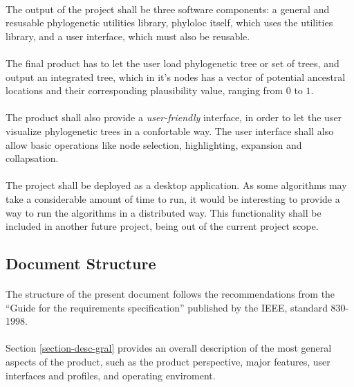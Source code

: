 \documentclass[10pt,a4paper]{article}
\begin{document}
\paragraph{}
The output of the project shall be three software components: a general and resusable phylogenetic utilities library, phyloloc itself, which uses the utilities library, and a user interface, which must also be reusable.
\paragraph{}
The final product has to let the user load phylogenetic tree or set of trees, and output an integrated tree, which in it's nodes has a vector of potential ancestral locations and their corresponding plausibility value, ranging from $0$ to $1$. 
\paragraph{}
The product shall also provide a \emph{user-friendly} interface, in order to let the user visualize phylogenetic trees in a confortable way. The user interface shall also allow basic operations like node selection, highlighting, expansion and collapsation.
\paragraph{}
The project shall be deployed as a desktop application. As some algorithms may take a considerable amount of time to run, it would be interesting to provide a way to run the algorithms in a distributed way. This functionality shall be included in another future project, being out of the current project scope.
\paragraph{}

  \subsection{Document Structure}
\paragraph{}
The structure of the present document follows the recommendations from the ``Guide for the requirements specification'' published by the IEEE, standard 830-1998. 
\paragraph{}
Section \ref{section-desc-gral} provides an overall description of the most general aspects of the product, such as the product perspective, major features, user interfaces and profiles, and operating enviroment.
\end{document}
